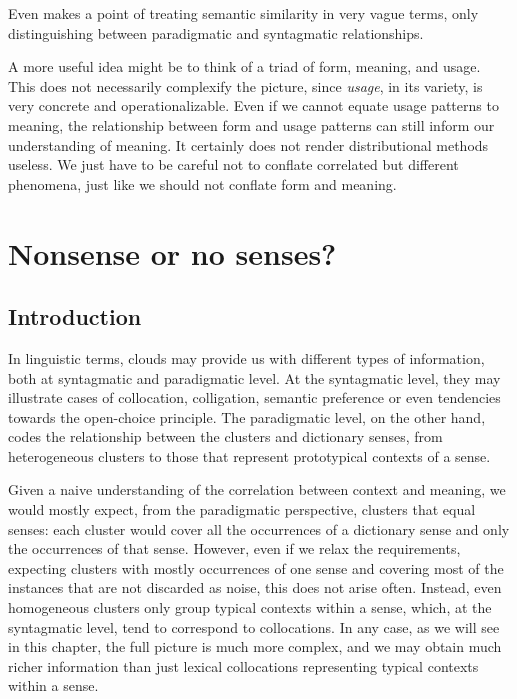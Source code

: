 \documentclass[
]{book}
\begin{document}
Even \textcite{sahlgren_2006} makes a point of treating semantic similarity in very vague terms,
only distinguishing between paradigmatic and syntagmatic relationships.

A more useful idea might be to think of a triad of form, meaning, and usage. This
does not necessarily complexify the picture, since \emph{usage}, in its variety, is very
concrete and operationalizable. Even if we cannot equate usage patterns to meaning,
the relationship between form and usage patterns can still inform our understanding of
meaning. It certainly does not render distributional methods useless. We just have
to be careful not to conflate correlated but different phenomena, just like we should
not conflate form and meaning.

\hypertarget{nonsense-or-no-senses}{%
\chapter{Nonsense or no senses?}\label{nonsense-or-no-senses}}

\hypertarget{introduction-1}{%
\section{Introduction}\label{introduction-1}}

In linguistic terms, clouds may provide us with different types of information, both at syntagmatic and paradigmatic level. At the syntagmatic level, they may illustrate cases of collocation, colligation, semantic preference or even tendencies towards the open-choice principle. The paradigmatic level, on the other hand, codes the relationship between the clusters and dictionary senses, from heterogeneous clusters to those that represent prototypical contexts of a sense.

Given a naive understanding of the correlation between context and meaning, we would mostly expect, from the paradigmatic perspective, clusters that equal senses: each cluster would cover all the occurrences of a dictionary sense and only the occurrences of that sense. However, even if we relax the requirements, expecting clusters with mostly occurrences of one sense and covering most of the instances that are not discarded as noise, this does not arise often. Instead, even homogeneous clusters only group typical contexts within a sense, which, at the syntagmatic level, tend to correspond to collocations. In any case, as we will see in this chapter, the full picture is much more complex, and we may obtain much richer information than just lexical collocations representing typical contexts within a sense.
\end{document}
